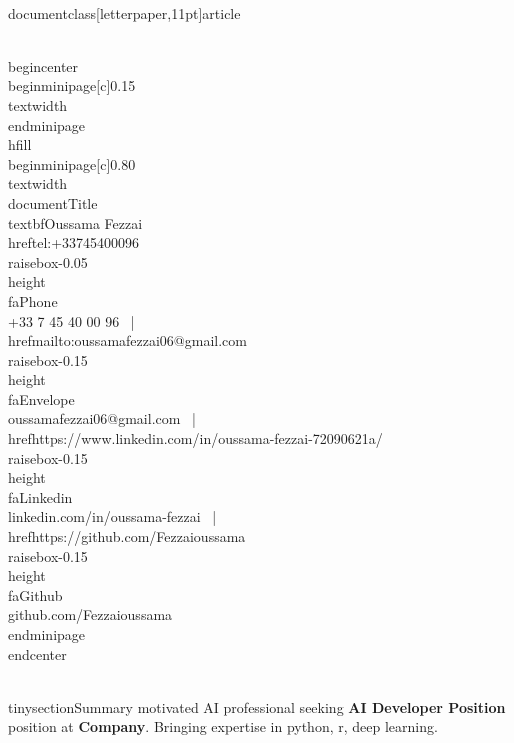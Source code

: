 \\documentclass[letterpaper,11pt]{article}
\begin{document}
\\begin{center}
  \\begin{minipage}[c]{0.15\\textwidth}
  \\end{minipage}\\hfill
  \\begin{minipage}[c]{0.80\\textwidth}
    \\documentTitle{\\textbf{Oussama Fezzai}}{
      \\href{tel:+33745400096}{\\raisebox{-0.05\\height}\\faPhone\\ +33 7 45 40 00 96} ~|~
      \\href{mailto:oussamafezzai06@gmail.com}{\\raisebox{-0.15\\height}\\faEnvelope\\ oussamafezzai06@gmail.com} ~|~
      \\href{https://www.linkedin.com/in/oussama-fezzai-72090621a/}{\\raisebox{-0.15\\height}\\faLinkedin\\ linkedin.com/in/oussama-fezzai} ~|~
      \\href{https://github.com/Fezzaioussama}{\\raisebox{-0.15\\height}\\faGithub\\ github.com/Fezzaioussama}
    }
  \\end{minipage}
\\end{center}

\\tinysection{Summary}
\Highly motivated AI professional seeking \textbf{AI Developer Position} position at \textbf{Company}. Bringing expertise in python, r, deep learning.
\end{document}
